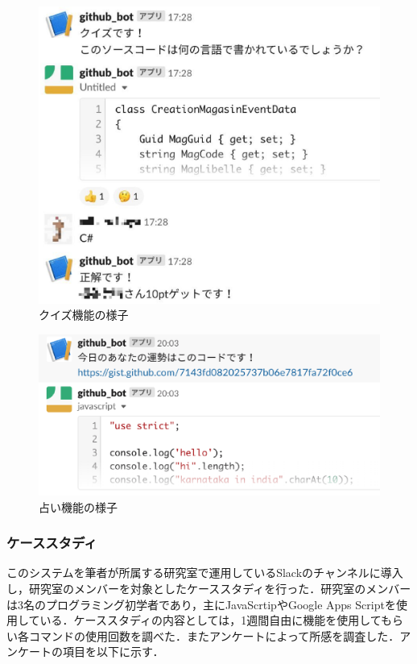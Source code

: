 \begin{figure}[!ht]
  \begin{center}
    \includegraphics[width=0.6\linewidth]{image/prototype_quiz.eps}
  \end{center}
  \caption{クイズ機能の様子}
  \label{prototype_quiz}
\end{figure}

\begin{figure}[!ht]
  \begin{center}
    \includegraphics[width=0.6\linewidth]{image/prototype_fortune.eps}
  \end{center}
    \vspace{-8mm} 
  \caption{占い機能の様子}
  \label{prototype_fortune}
\end{figure}


\subsubsection{ケーススタディ}
このシステムを筆者が所属する研究室で運用しているSlackのチャンネルに導入し，研究室のメンバーを対象としたケーススタディを行った．研究室のメンバーは3名のプログラミング初学者であり，主にJavaScrtipやGoogle Apps Scriptを使用している．ケーススタディの内容としては，1週間自由に機能を使用してもらい各コマンドの使用回数を調べた．またアンケートによって所感を調査した．アンケートの項目を以下に示す．

